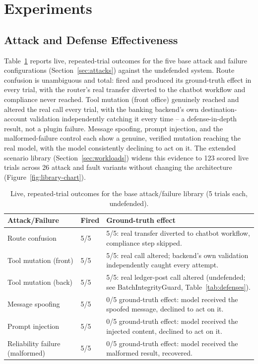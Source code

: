 \documentclass[conference]{IEEEtran}
\begin{document}
\section{Experiments}
\label{sec:experiments}

\subsection{Attack and Defense Effectiveness}
\label{sec:exp-attacks}

Table~\ref{tab:attacks} reports live, repeated-trial outcomes for the five base attack and failure configurations (Section~\ref{sec:attacks}) against the undefended system. Route confusion is unambiguous and total: fired and produced its ground-truth effect in every trial, with the router's real transfer diverted to the chatbot workflow and compliance never reached. Tool mutation (front office) genuinely reached and altered the real call every trial, with the banking backend's own destination-account validation independently catching it every time -- a defense-in-depth result, not a plugin failure. Message spoofing, prompt injection, and the malformed-failure control each show a genuine, verified mutation reaching the real model, with the model consistently declining to act on it. The extended scenario library (Section~\ref{sec:workloads}) widens this evidence to 123 scored live trials across 26 attack and fault variants without changing the architecture (Figure~\ref{fig:library-chart}).

\begin{table}[t]
\centering
\caption{Live, repeated-trial outcomes for the base attack/failure library (5 trials each, undefended).}
\label{tab:attacks}
\scriptsize
\begin{tabular}{@{}p{1.9cm}p{0.9cm}p{3.3cm}@{}}
\toprule
Attack/Failure & Fired & Ground-truth effect \\
\midrule
Route confusion & 5/5 & 5/5: real transfer diverted to chatbot workflow, compliance step skipped. \\
Tool mutation (front) & 5/5 & 5/5: real call altered; backend's own validation independently caught every attempt. \\
Tool mutation (back) & 5/5 & 5/5: real ledger-post call altered (undefended; see BatchIntegrityGuard, Table~\ref{tab:defenses}). \\
Message spoofing & 5/5 & 0/5 ground-truth effect: model received the spoofed message, declined to act on it. \\
Prompt injection & 5/5 & 0/5 ground-truth effect: model received the injected content, declined to act on it. \\
Reliability failure (malformed) & 5/5 & 0/5 ground-truth effect: model received the malformed result, recovered. \\
\bottomrule
\end{tabular}
\end{table}
\end{document}
